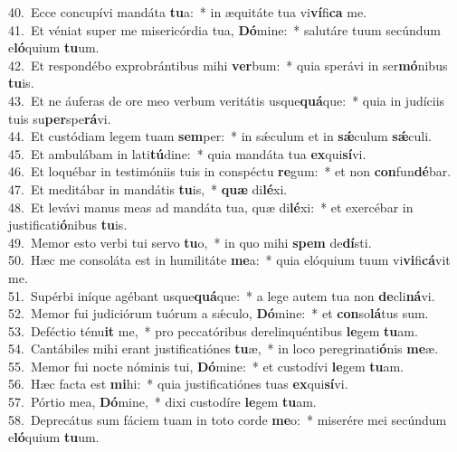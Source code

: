 {40.~}Ecce concupívi mandáta \textbf{tu}a:~* in æquitáte tua vi\textbf{ví}fi\textbf{ca} me.\\
{41.~}Et véniat super me misericórdia tua, \textbf{Dó}mine:~* salutáre tuum secúndum e\textbf{ló}quium \textbf{tu}um.\\
{42.~}Et respondébo exprobrántibus mihi \textbf{ver}bum:~* quia sperávi in ser\textbf{mó}nibus \textbf{tu}is.\\
{43.~}Et ne áuferas de ore meo verbum veritátis usque\textbf{quá}que:~* quia in judíciis tuis su\textbf{per}spe\textbf{rá}vi.\\
{44.~}Et custódiam legem tuam \textbf{sem}per:~* in sǽculum et in \textbf{sǽ}culum \textbf{sǽ}culi.\\
{45.~}Et ambulábam in lati\textbf{tú}dine:~* quia mandáta tua \textbf{ex}qui\textbf{sí}vi.\\
{46.~}Et loquébar in testimóniis tuis in conspéctu \textbf{re}gum:~* et non \textbf{con}fun\textbf{dé}bar.\\
{47.~}Et meditábar in mandátis \textbf{tu}is,~* \textbf{quæ} di\textbf{lé}xi.\\
{48.~}Et levávi manus meas ad mandáta tua, quæ di\textbf{lé}xi:~* et exercébar in justificati\textbf{ó}nibus \textbf{tu}is.\\
{49.~}Memor esto verbi tui servo \textbf{tu}o,~* in quo mihi \textbf{spem} de\textbf{dí}sti.\\
{50.~}Hæc me consoláta est in humilitáte \textbf{me}a:~* quia elóquium tuum vi\textbf{vi}fi\textbf{cá}vit me.\\
{51.~}Supérbi iníque agébant usque\textbf{quá}que:~* a lege autem tua non \textbf{de}cli\textbf{ná}vi.\\
{52.~}Memor fui judiciórum tuórum a sǽculo, \textbf{Dó}mine:~* et \textbf{con}so\textbf{lá}tus sum.\\
{53.~}Deféctio ténu\textbf{it} me,~* pro peccatóribus derelinquéntibus \textbf{le}gem \textbf{tu}am.\\
{54.~}Cantábiles mihi erant justificatiónes \textbf{tu}æ,~* in loco peregrinati\textbf{ó}nis \textbf{me}æ.\\
{55.~}Memor fui nocte nóminis tui, \textbf{Dó}mine:~* et custodívi \textbf{le}gem \textbf{tu}am.\\
{56.~}Hæc facta est \textbf{mi}hi:~* quia justificatiónes tuas \textbf{ex}qui\textbf{sí}vi.\\
{57.~}Pórtio mea, \textbf{Dó}mine,~* dixi custodíre \textbf{le}gem \textbf{tu}am.\\
{58.~}Deprecátus sum fáciem tuam in toto corde \textbf{me}o:~* miserére mei secúndum e\textbf{ló}quium \textbf{tu}um.\\
